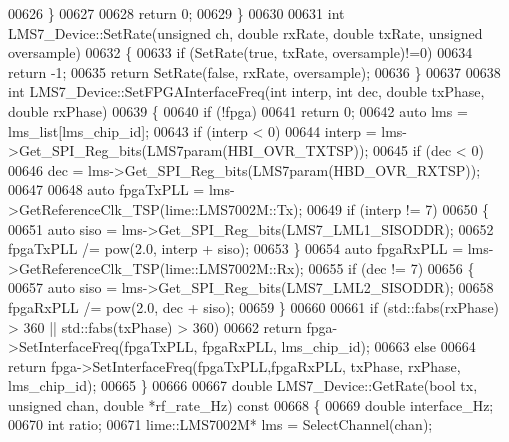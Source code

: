 \begin{DoxyCode}
00626     \}
00627 
00628    \textcolor{keywordflow}{return} 0;
00629 \}
00630 
00631 \textcolor{keywordtype}{int} LMS7_Device::SetRate(\textcolor{keywordtype}{unsigned} ch, \textcolor{keywordtype}{double} rxRate, \textcolor{keywordtype}{double} txRate, \textcolor{keywordtype}{unsigned} 
      oversample)
00632 \{
00633     \textcolor{keywordflow}{if} (SetRate(\textcolor{keyword}{true}, txRate, oversample)!=0)
00634         \textcolor{keywordflow}{return} -1;
00635     \textcolor{keywordflow}{return} SetRate(\textcolor{keyword}{false}, rxRate, oversample);
00636 \}
00637 
00638 \textcolor{keywordtype}{int} LMS7_Device::SetFPGAInterfaceFreq(\textcolor{keywordtype}{int} interp, \textcolor{keywordtype}{int} dec, \textcolor{keywordtype}{double} txPhase, \textcolor{keywordtype}{double} rxPhase)
00639 \{
00640     \textcolor{keywordflow}{if} (!fpga)
00641         \textcolor{keywordflow}{return} 0;
00642     \textcolor{keyword}{auto} lms = lms_list[lms_chip_id];
00643     \textcolor{keywordflow}{if} (interp < 0)
00644         interp = lms->Get\_SPI\_Reg\_bits(LMS7param(HBI_OVR_TXTSP));
00645     \textcolor{keywordflow}{if} (dec < 0)
00646         dec = lms->Get\_SPI\_Reg\_bits(LMS7param(HBD_OVR_RXTSP));
00647 
00648     \textcolor{keyword}{auto} fpgaTxPLL = lms->GetReferenceClk\_TSP(lime::LMS7002M::Tx);
00649     \textcolor{keywordflow}{if} (interp != 7)
00650     \{
00651         \textcolor{keyword}{auto} siso =  lms->Get\_SPI\_Reg\_bits(LMS7_LML1_SISODDR);
00652         fpgaTxPLL /= pow(2.0, interp + siso);
00653     \}
00654     \textcolor{keyword}{auto} fpgaRxPLL = lms->GetReferenceClk\_TSP(lime::LMS7002M::Rx);
00655     \textcolor{keywordflow}{if} (dec != 7)
00656     \{
00657         \textcolor{keyword}{auto} siso =  lms->Get\_SPI\_Reg\_bits(LMS7_LML2_SISODDR);
00658         fpgaRxPLL /= pow(2.0, dec + siso);
00659     \}
00660 
00661     \textcolor{keywordflow}{if} (std::fabs(rxPhase) > 360 || std::fabs(txPhase) > 360)
00662         \textcolor{keywordflow}{return} fpga->SetInterfaceFreq(fpgaTxPLL, fpgaRxPLL, lms_chip_id);
00663     \textcolor{keywordflow}{else}
00664         \textcolor{keywordflow}{return} fpga->SetInterfaceFreq(fpgaTxPLL,fpgaRxPLL, txPhase, rxPhase, 
      lms_chip_id);
00665 \}
00666 
00667 \textcolor{keywordtype}{double} LMS7_Device::GetRate(\textcolor{keywordtype}{bool} tx, \textcolor{keywordtype}{unsigned} chan, \textcolor{keywordtype}{double} *rf\_rate\_Hz)\textcolor{keyword}{ const}
00668 \textcolor{keyword}{}\{
00669     \textcolor{keywordtype}{double} interface\_Hz;
00670     \textcolor{keywordtype}{int} ratio;
00671     lime::LMS7002M* lms = SelectChannel(chan);

\end{DoxyCode}
